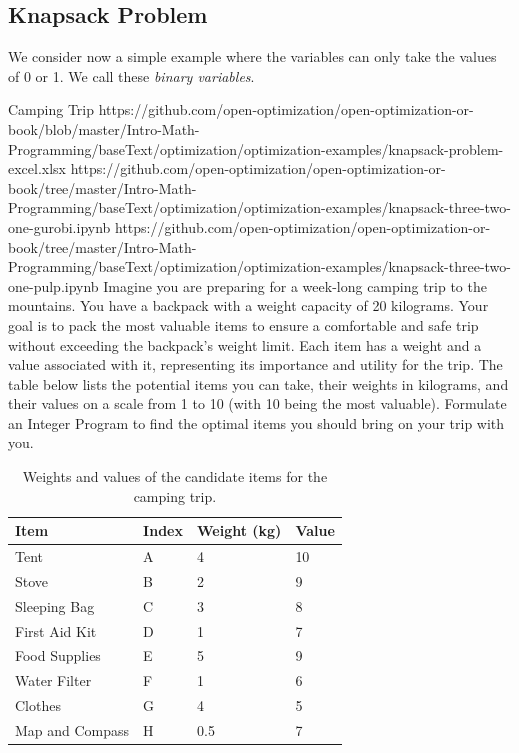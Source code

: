 \newpage
\subsection{Knapsack Problem}
We consider now a simple example where the variables can only take the values of 0 or 1.  We call these \emph{binary variables}.
\begin{examplewithallcode}{Camping Trip}
{https://github.com/open-optimization/open-optimization-or-book/blob/master/Intro-Math-Programming/baseText/optimization/optimization-examples/knapsack-problem-excel.xlsx}
{https://github.com/open-optimization/open-optimization-or-book/tree/master/Intro-Math-Programming/baseText/optimization/optimization-examples/knapsack-three-two-one-gurobi.ipynb}
{https://github.com/open-optimization/open-optimization-or-book/tree/master/Intro-Math-Programming/baseText/optimization/optimization-examples/knapsack-three-two-one-pulp.ipynb}
Imagine you are preparing for a week-long camping trip to the mountains. You have a backpack with a weight capacity of 20 kilograms. Your goal is to pack the most valuable items to ensure a comfortable and safe trip without exceeding the backpack's weight limit. Each item has a weight and a value associated with it, representing its importance and utility for the trip. The table below lists the potential items you can take, their weights in kilograms, and their values on a scale from 1 to 10 (with 10 being the most valuable).
\newline
Formulate an Integer Program to find the optimal items you should bring on your trip with you. 
\end{examplewithallcode}

\begin{table}[h!] \begin{center} \begin{tabular} {|l|l|l|l|} 
\hline Item & Index & Weight (kg) & Value  \\ \hline
\hline Tent & A & 4 & 10  \\
\hline Stove & B & 2 & 9  \\
\hline Sleeping Bag & C & 3 & 8  \\
\hline First Aid Kit & D & 1 & 7  \\
\hline Food Supplies & E & 5 & 9  \\
\hline Water Filter & F & 1 & 6  \\
\hline Clothes & G & 4 & 5  \\
\hline Map and Compass & H & 0.5 & 7  \\
\hline \end{tabular} \end{center} \caption{Weights and values of the candidate items for the camping trip.}\label{tab:modeling-linear-programming-tab04}%
\end{table}

